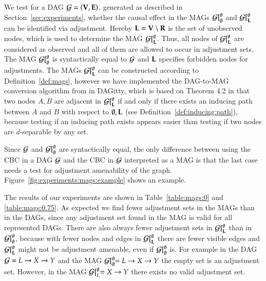 \begin{newpartinrevision}[r2c7]
We test for a DAG ${\cal G}=({\bf V},{\bf E})$, generated as described  in Section~\ref{sec:experiments}, whether the causal effect in the MAGs  ${\cal G}[^\emptyset_\emptyset$ and ${\cal G}[_{\bf L}^\emptyset$ can be identified via  adjustment. Hereby ${\bf L} = {\bf V}\setminus{\bf R}$ is the set of unobserved nodes, which is used to determine the MAG ${\cal G}[_{\bf L}^\emptyset$. Thus, all nodes  of ${\cal G}[_{\bf L}^\emptyset$ are considered as observed and all of them are allowed to occur in adjustment sets. The MAG  ${\cal G}[_\emptyset^\emptyset$ is syntactically equal to ${\cal G}$ and ${\bf L}$ specifies forbidden nodes for adjustments. %
%
The MAGs  ${\cal G}[_{\bf L}^\emptyset$ can be constructed according to Definition~\ref{def:mags}, 
however we have implemented the DAG-to-MAG conversion algorithm from \cite{Zhang2008} in DAGitty, 
which is based on Theorem 4.2 in \citep{Richardson2002} that two nodes $A, B$ are adjacent 
in ${\cal G}[^\emptyset_{\bf L}$ if and only if there exists an inducing path  between $A$ and $B$  
with respect to $\emptyset, {\bf L}$ (see Definition~\ref{def:inducing:path}), because testing if an inducing path exists appears easier than testing if two nodes are $d$-separable by any set. 
 
Since ${\cal G}$ and ${\cal G}[^\emptyset_\emptyset$ are syntactically equal,
the only difference between using the CBC in a DAG ${\cal G}$ and the CBC in 
${\cal G}$ interpreted as a  MAG is that the last case needs a test for adjustment amenability of the graph. 
Figure~\ref{fig:experiments:mags:example} shows an example.

%

The results of our experiments are shown in Table~\ref{table:mags:0} and \ref{table:mags:0.75}. 
As expected we find fewer adjustment sets in the MAGs than in the DAGs, since any adjustment 
set found in the MAG is valid for all represented DAGs.
There are also always fewer adjustment sets in ${\cal G}[_{\bf L}^\emptyset$ than in ${\cal G}[^\emptyset_\emptyset$, because with fewer nodes and edges in ${\cal G}[_{\bf L}^\emptyset$ there are fewer visible edges and ${\cal G}[_{\bf L}^\emptyset$ might not be adjustment amenable, even if ${\cal G}[^\emptyset_\emptyset$ is.
For example in the DAG ${\cal G}=L \to X \to Y$ and the MAG ${\cal G}[^\emptyset_\emptyset = L \to X \to Y$ 
the empty set is an adjustment set.  
However, in the MAG ${\cal G}[_L^\emptyset = X \to Y$ there exists no valid adjustment set. %


\end{newpartinrevision}
